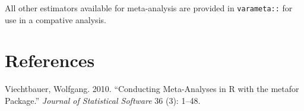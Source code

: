 \documentclass[
]{article}
\newlength{\cslhangindent}
\newenvironment{cslreferences}%
  {\setlength{\parindent}{0pt}%
  \everypar{\setlength{\hangindent}{\cslhangindent}}\ignorespaces}%
  {\par}
\begin{document}
All other estimators available for meta-analysis are provided in
\texttt{varameta::} for use in a compative analysis.

\hypertarget{references}{%
\section*{References}\label{references}}

\hypertarget{refs}{}
\begin{cslreferences}
\leavevmode\hypertarget{ref-viechtbauerConductingMetaanalysesMetafor2010}{}%
Viechtbauer, Wolfgang. 2010. ``Conducting Meta-Analyses in R with the
metafor Package.'' \emph{Journal of Statistical Software} 36 (3): 1--48.
\end{cslreferences}
\end{document}
